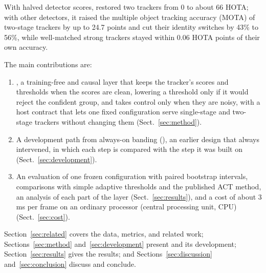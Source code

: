 With halved detector scores, \scl{} restored two trackers from 0 to about 66 HOTA; with other
detectors, it raised the multiple object tracking accuracy (MOTA) of two-stage trackers by up to
24.7 points and cut their identity switches by 43\% to 56\%, while well-matched strong trackers
stayed within 0.06 HOTA points of their own accuracy.

The main contributions are:
\begin{enumerate}
\item \scl{}, a training-free and causal layer that keeps the tracker's scores and thresholds when
      the scores are clean, lowering a threshold only if it would reject the confident group, and
      takes control only when they are noisy, with a host contract that lets one fixed
      configuration serve single-stage and two-stage trackers without changing them
      (Sect.~\ref{sec:method}).
\item A development path from always-on banding (\aob{}), an earlier design that always
      intervened, in which each step is compared with the step it was built on
      (Sect.~\ref{sec:development}).
\item An evaluation of one frozen configuration with paired bootstrap intervals, comparisons with
      simple adaptive thresholds and the published ACT method, an analysis of each part of the
      layer (Sect.~\ref{sec:results}), and a cost of about 3 ms per frame on an ordinary processor
      (central processing unit, CPU) (Sect.~\ref{sec:cost}).
\end{enumerate}

Section~\ref{sec:related} covers the data, metrics, and related work;
Sections~\ref{sec:method} and~\ref{sec:development} present \scl{} and its development;
Section~\ref{sec:results} gives the results; and Sections~\ref{sec:discussion}
and~\ref{sec:conclusion} discuss and conclude.
